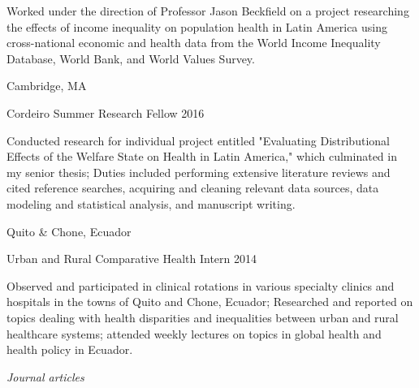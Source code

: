 \documentclass[11pt,article,oneside]{memoir}
\begin{document}
{\noindent \footnotesize Worked under the direction of Professor Jason Beckfield on a project researching the effects of income
inequality on population health in Latin America using cross-national economic and health data from the
World Income Inequality Database, World Bank, and World Values Survey.}

\bigskip

 \hfill Cambridge, MA

\ind Cordeiro Summer Research Fellow\vspace{0.02in} \hfill 2016

{\noindent \footnotesize Conducted research for individual project entitled "Evaluating Distributional Effects of the Welfare State on
Health in Latin America," which culminated in my senior thesis; Duties included performing extensive
literature reviews and cited reference searches, acquiring and cleaning relevant data sources, data modeling
and statistical analysis, and manuscript writing.}

\bigskip

 \hfill Quito \& Chone, Ecuador

\ind Urban and Rural Comparative Health Intern\vspace{0.02in} \hfill 2014

{\noindent \footnotesize Observed and participated in clinical rotations in various specialty clinics and hospitals in the towns of Quito
and Chone, Ecuador; Researched and reported on topics dealing with health disparities and inequalities between urban and rural healthcare systems; 
attended weekly lectures on topics in global health and health policy in Ecuador.}

\newpage

\medskip

\noindent\emph{Journal articles \vspace{0.05in}}

\end{document}
